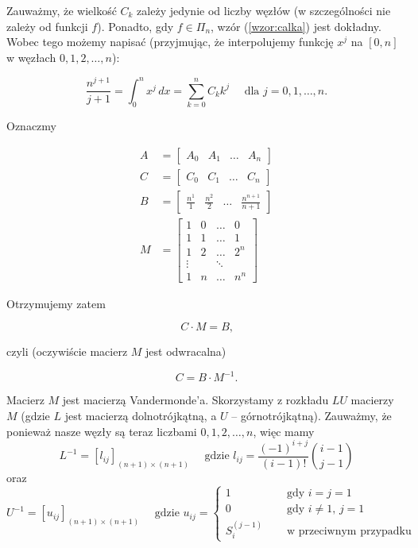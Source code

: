 \documentclass{article}
\theoremstyle{definition}
\begin{document}
\noindent Zauważmy, że wielkość \(C_k\) zależy jedynie od liczby węzłów (w szczególności nie zależy od funkcji \(f\)). Ponadto, gdy \(f \in \Pi_n\), wzór (\ref{wzor:calka}) jest dokładny. Wobec tego możemy napisać (przyjmując, że interpolujemy funkcję \(x^j\) na \([0,n]\) w węzłach \(0, 1, 2, \ldots, n\)):

\[
    \frac{n^{j+1}}{j+1} = \int_0^{n} x^j \,dx = \sum_{k=0}^{n} C_k k^j \quad \text{ dla } j=0,1,\ldots, n \text{.}
\]


\noindent Oznaczmy

\begin{align*}
     A &=  \begin{bmatrix}
        A_0 & A_1 & \ldots & A_n
    \end{bmatrix} \\
    C &=  \begin{bmatrix}
        C_0 & C_1 & \ldots & C_n
    \end{bmatrix} \\
    B &= \begin{bmatrix}
        \frac{n^1}{1} &
        \frac{n^2}{2} &
        \ldots &
        \frac{n^{n+1}}{n+1}
    \end{bmatrix} \\
    M &= \begin{bmatrix}
        1 & 0 & \ldots & 0 \\
        1 & 1 & \ldots & 1 \\
        1 & 2 & \ldots & 2^n \\
        \vdots & & \ddots & \\
        1 & n & \ldots & n^n
    \end{bmatrix}
\end{align*}

\noindent Otrzymujemy zatem

\[
    \label{wzor:macierz}
     C \cdot M = B \text{,}
\]

\noindent czyli (oczywiście macierz \(M\) jest odwracalna)

\[
     C = B \cdot M^{-1} \text{.}
\]


\noindent Macierz \(M\) jest macierzą Vandermonde'a.  Skorzystamy z rozkładu \(LU\) macierzy \(M\) (gdzie \(L\) jest macierzą dolnotrójkątną, a \(U\) -- górnotrójkątną). Zauważmy, że ponieważ nasze węzły są teraz liczbami \(0, 1, 2, \ldots, n\), więc mamy
\[
    L^{-1} = [l_{ij}]_{(n+1) \times (n+1)} \quad \text{ gdzie }
    l_{ij} = \frac{(-1)^{i+j}}{(i-1)!} \binom{i-1}{j-1}
\]
oraz 
\[
    U^{-1} = [u_{ij}]_{(n+1) \times (n+1)} \quad \text{ gdzie }
    u_{ij} = \begin{cases}
        1 \quad &\text{ gdy } i=j=1 \\
        0  \quad &\text{ gdy } i \neq 1, \, j=1 \\
        S_i^{(j-1)} \quad &\text{ w przeciwnym przypadku}
    \end{cases}
\]
\end{document}
